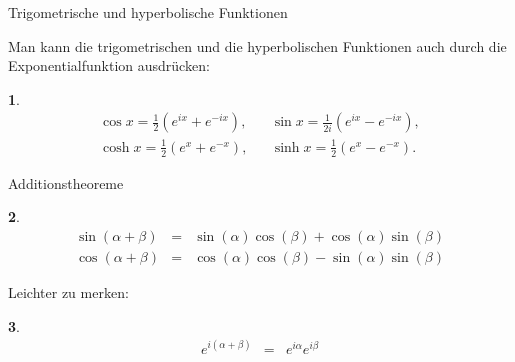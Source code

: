 \documentclass[german]{beamer}
\newcommand{\bq}{\begin{eqnarray*}}
\newcommand{\eq}{\end{eqnarray*}}
\newtheorem*{myemptytheorem}{}
\begin{document}
\begin{frame}{Trigometrische und hyperbolische Funktionen}

Man kann die trigometrischen und die hyperbolischen Funktionen auch durch die Exponentialfunktion ausdr\"ucken:
\begin{myemptytheorem}
\bq
 \cos x = \frac{1}{2} \left( e^{ix} + e^{-ix} \right),
 & &
 \sin x = \frac{1}{2i} \left( e^{ix} - e^{-ix} \right),
 \nonumber \\
 \cosh x = \frac{1}{2} \left( e^{x} + e^{-x} \right),
 & &
 \sinh x = \frac{1}{2} \left( e^{x} - e^{-x} \right).
\eq
\end{myemptytheorem}

\end{frame}

\begin{frame}{Additionstheoreme}

\begin{myemptytheorem}
\bq
 \sin\left(\alpha+\beta\right) 
 & = &
 \sin\left(\alpha\right) \cos\left(\beta\right) + \cos\left(\alpha\right) \sin\left(\beta\right)
 \nonumber \\
 \cos\left(\alpha+\beta\right) 
 & = &
 \cos\left(\alpha\right) \cos\left(\beta\right) - \sin\left(\alpha\right) \sin\left(\beta\right)
\eq
\end{myemptytheorem}
Leichter zu merken:
\begin{myemptytheorem}
\bq
 e^{i \left(\alpha+\beta\right)} 
 & = &
 e^{i \alpha} 
 e^{i \beta} 
\eq
\end{myemptytheorem}

\end{frame}
\end{document}
